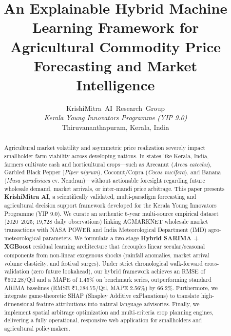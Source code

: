 \documentclass[journal,10pt,twocolumn]{IEEEtran}
\begin{document}
\title{An Explainable Hybrid Machine Learning Framework for Agricultural Commodity Price Forecasting and Market Intelligence}

\author{KrishiMitra~AI~Research~Group\\
\textit{Kerala Young Innovators Programme (YIP 9.0)}\\
Thiruvananthapuram, Kerala, India}

\maketitle

\begin{abstract}
Agricultural market volatility and asymmetric price realization severely impact smallholder farm viability across developing nations. In states like Kerala, India, farmers cultivate cash and horticultural crops---such as Arecanut (\textit{Areca catechu}), Garbled Black Pepper (\textit{Piper nigrum}), Coconut/Copra (\textit{Cocos nucifera}), and Banana (\textit{Musa paradisiaca} cv. Nendran)---without actionable foresight regarding future wholesale demand, market arrivals, or inter-mandi price arbitrage. This paper presents \textbf{KrishiMitra AI}, a scientifically validated, multi-paradigm forecasting and agricultural decision support framework developed for the Kerala Young Innovators Programme (YIP 9.0). We curate an authentic 6-year multi-source empirical dataset (2020--2025; 19,728 daily observations) linking AGMARKNET wholesale market transactions with NASA POWER and India Meteorological Department (IMD) agro-meteorological parameters. We formulate a two-stage \textbf{Hybrid SARIMA + XGBoost} residual learning architecture that decouples linear secular/seasonal components from non-linear exogenous shocks (rainfall anomalies, market arrival volume elasticity, and festival surges). Under strict chronological walk-forward cross-validation (zero future lookahead), our hybrid framework achieves an RMSE of ₹602.28/Qtl and a MAPE of 1.45\% on benchmark series, outperforming standard ARIMA baselines (RMSE ₹1,784.75/Qtl, MAPE 2.56\%) by 66.2\%. Furthermore, we integrate game-theoretic SHAP (Shapley Additive exPlanations) to translate high-dimensional feature attributions into natural-language advisories. Finally, we implement spatial arbitrage optimization and multi-criteria crop planning engines, delivering a fully operational, responsive web application for smallholders and agricultural policymakers.
\end{abstract}
\end{document}

